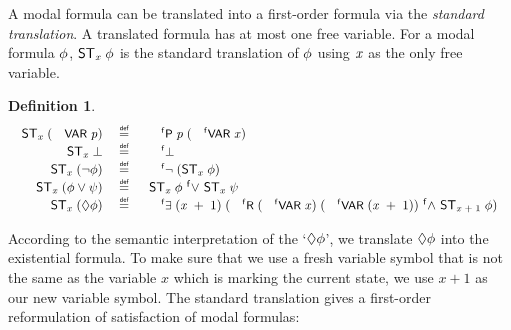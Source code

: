 \documentclass{llncs}
\newtheorem{defn}{Definition}[chapter]
\newenvironment{holmath}{\begin{displaymath}\begin{array}{l}}{\end{array}\end{displaymath}\ignorespacesafterend}
\renewcommand{\HOLConst}[1]{{\textsf{\upshape\small #1}}}
\renewcommand{\HOLinline}[1]{\ensuremath{#1}}
\begin{document}
A modal formula can be translated into a first-order formula via the \emph{standard translation}. A translated formula has at most one free variable. For a modal formula \HOLinline{\HOLFreeVar{\ensuremath{\phi}}}, \HOLinline{{\sf ST}\sb{\HOLFreeVar{x}}\;\HOLFreeVar{\ensuremath{\phi}}} is the standard translation of \HOLinline{\HOLFreeVar{\ensuremath{\phi}}} using \HOLinline{\HOLFreeVar{x}} as the only free variable.
\begin{defn}
{\upshape\cite[Definition 2.45 (Standard Translation)]{Blackburn}}
\begin{holmath}
\begin{array}{rcl}
  {\sf ST}\sb{\HOLFreeVar{x}}\;(\HOLConst{VAR}\;\HOLFreeVar{p})\;&\HOLTokenDefEquality{}&\;\HOLConst{\ensuremath{{}\sp{\mathsf{f}}\mathsf{P}}}\;\HOLFreeVar{p}\;(\HOLConst{\ensuremath{{}^{\sf f}{\sf VAR}}}\;\HOLFreeVar{x})\\
{\sf ST}\sb{\HOLFreeVar{x}}\;\HOLSymConst{\ensuremath{\bot}}\;&\HOLTokenDefEquality{}&\;\HOLConst{\ensuremath{{}^{\sf f}\bot}}\\
{\sf ST}\sb{\HOLFreeVar{x}}\;(\HOLSymConst{\HOLTokenNeg{}}\HOLFreeVar{\ensuremath{\phi}})\;&\HOLTokenDefEquality{}&\;\HOLConst{\ensuremath{{^{\sf f}}{\lnot}}}\;({\sf ST}\sb{\HOLFreeVar{x}}\;\HOLFreeVar{\ensuremath{\phi}})\\
{\sf ST}\sb{\HOLFreeVar{x}}\;(\HOLFreeVar{\ensuremath{\phi}}\HOLSymConst{\ensuremath{\lor}}\HOLFreeVar{\ensuremath{\psi}})\;&\HOLTokenDefEquality{}&\;{\sf ST}\sb{\HOLFreeVar{x}}\;\HOLFreeVar{\ensuremath{\phi}}\HOLSymConst{\ensuremath{\ {}^{\sf f} {\lor} \ }}{\sf ST}\sb{\HOLFreeVar{x}}\;\HOLFreeVar{\ensuremath{\psi}}\\
{\sf ST}\sb{\HOLFreeVar{x}}\;(\HOLSymConst{\ensuremath{\Diamond}}\HOLFreeVar{\ensuremath{\phi}})\;&\HOLTokenDefEquality{}&\;\HOLConst{\ensuremath{ {}^{\sf f}{\exists}}}\;(\HOLFreeVar{x}\;\HOLSymConst{\ensuremath{+}}\;\HOLNumLit{1})\;(\HOLConst{\ensuremath{{}^{\sf f}{\sf R}}}\;(\HOLConst{\ensuremath{{}^{\sf f}{\sf VAR}}}\;\HOLFreeVar{x})\;(\HOLConst{\ensuremath{{}^{\sf f}{\sf VAR}}}\;(\HOLFreeVar{x}\;\HOLSymConst{\ensuremath{+}}\;\HOLNumLit{1}))\HOLSymConst{\ensuremath{\ {}^{\sf f}{\land} \ }}{\sf ST}\sb{\HOLFreeVar{x}\;\HOLSymConst{\ensuremath{+}}\;\HOLNumLit{1}}\;\HOLFreeVar{\ensuremath{\phi}})
\end{array}
\end{holmath}
\end{defn}
According to the semantic interpretation of the `\HOLinline{\HOLSymConst{\ensuremath{\Diamond}}\HOLFreeVar{\ensuremath{\phi}}}', we translate \HOLinline{\HOLSymConst{\ensuremath{\Diamond}}\HOLFreeVar{\ensuremath{\phi}}} into the existential formula. To make sure that we use a fresh variable symbol that is not the same as the variable $x$ which is marking the current state, we use $x+1$ as our new variable symbol. The standard translation gives a first-order reformulation of satisfaction of modal formulas:
\end{document}
